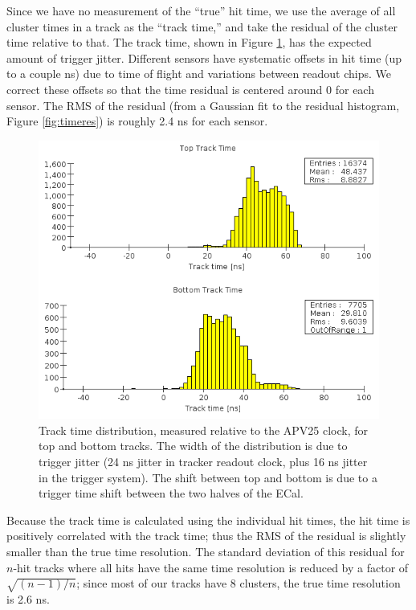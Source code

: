 Since we have no measurement of the ``true'' hit time, we use the average of all cluster times in a track as the ``track time,'' and take the residual of the cluster time relative to that.
The track time, shown in Figure \ref{fig:tracktime}, has the expected amount of trigger jitter.
Different sensors have systematic offsets in hit time (up to a couple ns) due to time of flight and variations between readout chips. 
We correct these offsets so that the time residual is centered around 0 for each sensor. The RMS of the residual (from a Gaussian fit to the residual histogram, Figure \ref{fig:timeres}) is roughly 2.4 ns for each sensor.

\begin{figure}[ht]
	\includegraphics[width=\textwidth]{test2012/svtperformance/track_time}
	\caption{\small{Track time distribution, measured relative
	to the APV25 clock, for top and bottom tracks. The
width of the distribution is due to trigger jitter (24 ns
jitter in tracker readout clock, plus 16 ns jitter in the
trigger system). The shift between top and bottom
is due to a trigger time shift between the two halves
of the ECal.} }
	\label{fig:tracktime}
\end{figure}


Because the track time is calculated using the individual hit times, the hit time is positively correlated with the track time; thus the RMS of the residual is slightly smaller than the true time resolution.
The standard deviation of this residual for $n$-hit tracks where all hits have the same time resolution is reduced by a factor of $\sqrt{(n-1)/n}$; since most of our tracks have 8 clusters, the true time resolution is 2.6 ns. 

